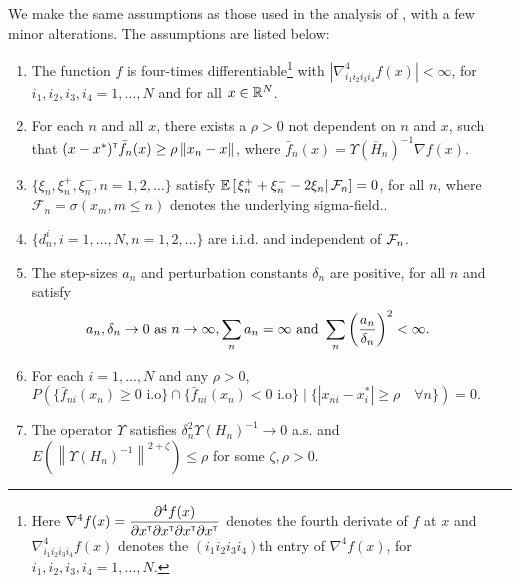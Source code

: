 We make the same assumptions as those used in the analysis of \cite{prashanth2015rdsa}, with a few minor alterations. The assumptions are listed below:
\begin{enumerate}[label=(\textbf{C\arabic*})]
\item  The function
$f$ is four-times differentiable\footnote{Here $\nabla^4 f(x) = \dfrac{\partial^4 f (x)}{\partial x^\mathsf{\scriptscriptstyle T} \partial x^\mathsf{\scriptscriptstyle T} \partial x^\mathsf{\scriptscriptstyle T} \partial x^\mathsf{\scriptscriptstyle T}}$ denotes the fourth derivate of $f$ at $x$ and $\nabla^4_{i_1 i_2 i_3 i_4} f(x)$ denotes the $(i_1 i_2 i_3 i_4)$th entry of $\nabla^4 f(x)$, for $i_1, i_2, i_3,i_4=1,\ldots, N$.} with $\left|\nabla^4_{i_1 i_2 i_3 i_4} f(x) \right| < \infty$, for $i_1, i_2, i_3,i_4=1,\ldots, N$ and for all $x\in \mathbb{R}^N$. 


\item For each $n$ and all $x$, there exists a $\rho>0$ not dependent on $n$ and $x$, such that $(x-x^*)^\mathsf{\scriptscriptstyle T} \bar f_n(x) \ge \rho \left\| x_n - x\right\|$, where $\bar f_n(x) = \Upsilon(\overline H_n)^{-1} \nabla f(x)$.

\item $\{\xi_n, \xi_n^+,\xi_n^-, n=1,2,\ldots\}$ satisfy $\mathbb{E}\left[\left. \xi_n^+ + \xi_n^- - 2 \xi_n \right| \mathcal{F}_n\right] = 0$, for all $n$, where $\mathcal{F}_n = \sigma(x_m,m\le n)$ denotes the underlying sigma-field.. 

\item $\{d_n^i, i=1,\ldots,N, n=1,2,\ldots\}$ are i.i.d. and independent of $\mathcal{F}_n$.

\item  The step-sizes $a_n$ and perturbation constants $\delta_n$ are positive, for all $n$ and satisfy
$$\hspace{-2em} a_n, \delta_n \rightarrow 0\text{ as } n \rightarrow \infty, 
\sum_n a_n=\infty \text{ and } \sum_n \left(\frac{a_n}{\delta_n}\right)^2 <\infty.$$

\item For each $i=1,\ldots,N$ and any $\rho>0$, 
$P(\{ \bar f_{ni} (x_n) \ge 0 \text{ i.o}\} \cap \{ \bar f_{ni} (x_n) < 0 \text{ i.o}\} \mid \{ |x_{ni} - x^*_i| \ge \rho\quad \forall n\}) =0.$

\item The operator $\Upsilon$ satisfies $\delta_n^2 \Upsilon(H_n)^{-1} \rightarrow 0$ a.s. and  $E(\left\| \Upsilon(H_n)^{-1}\right\|^{2+\zeta}) \le \rho$ for some $\zeta, \rho>0$.


\end{enumerate}
